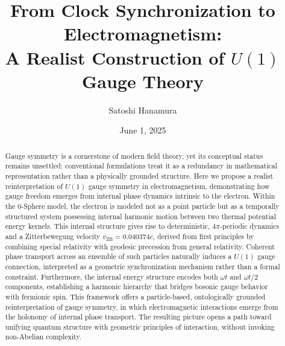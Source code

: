 \documentclass[%
 reprint,
 amsmath,amssymb,
 aps,
]{revtex4-1}
\numberwithin{equation}{section}%
\begin{document}


\title{From Clock Synchronization to Electromagnetism: \\A Realist Construction of $U(1)$ Gauge Theory}

\author{Satoshi Hanamura}
\date{June 1, 2025}


\begin{abstract}
Gauge symmetry is a cornerstone of modern field theory, yet its conceptual status remains unsettled: conventional formulations treat it as a redundancy in mathematical representation rather than a physically grounded structure. Here we propose a realist reinterpretation of $U(1)$ gauge symmetry in electromagnetism, demonstrating how gauge freedom emerges from internal phase dynamics intrinsic to the electron. Within the 0-Sphere model, the electron is modeled not as a point particle but as a temporally structured system possessing internal harmonic motion between two thermal potential energy kernels. This internal structure gives rise to deterministic, $4\pi$-periodic dynamics and a Zitterbewegung velocity $v_{\text{ZB}} = 0.040374c$, derived from first principles by combining special relativity with geodesic precession from general relativity.
Coherent phase transport across an ensemble of such particles naturally induces a $U(1)$ gauge connection, interpreted as a geometric synchronization mechanism rather than a formal constraint. Furthermore, the internal energy structure encodes both $\omega t$ and $\omega t/2$ components, establishing a harmonic hierarchy that bridges bosonic gauge behavior with fermionic spin. This framework offers a particle-based, ontologically grounded reinterpretation of gauge symmetry, in which electromagnetic interactions emerge from the holonomy of internal phase transport. The resulting picture opens a path toward unifying quantum structure with geometric principles of interaction, without invoking non-Abelian complexity.
\end{abstract}


\maketitle
\end{document}
